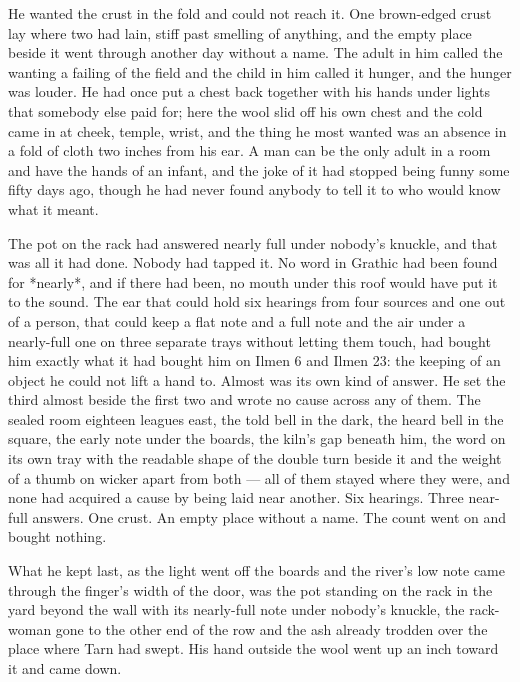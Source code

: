 He wanted the crust in the fold and could not reach it. One brown-edged crust lay where two had lain, stiff past smelling of anything, and the empty place beside it went through another day without a name. The adult in him called the wanting a failing of the field and the child in him called it hunger, and the hunger was louder. He had once put a chest back together with his hands under lights that somebody else paid for; here the wool slid off his own chest and the cold came in at cheek, temple, wrist, and the thing he most wanted was an absence in a fold of cloth two inches from his ear. A man can be the only adult in a room and have the hands of an infant, and the joke of it had stopped being funny some fifty days ago, though he had never found anybody to tell it to who would know what it meant.

The pot on the rack had answered nearly full under nobody's knuckle, and that was all it had done. Nobody had tapped it. No word in Grathic had been found for *nearly*, and if there had been, no mouth under this roof would have put it to the sound. The ear that could hold six hearings from four sources and one out of a person, that could keep a flat note and a full note and the air under a nearly-full one on three separate trays without letting them touch, had bought him exactly what it had bought him on Ilmen 6 and Ilmen 23: the keeping of an object he could not lift a hand to. Almost was its own kind of answer. He set the third almost beside the first two and wrote no cause across any of them. The sealed room eighteen leagues east, the told bell in the dark, the heard bell in the square, the early note under the boards, the kiln's gap beneath him, the word on its own tray with the readable shape of the double turn beside it and the weight of a thumb on wicker apart from both --- all of them stayed where they were, and none had acquired a cause by being laid near another. Six hearings. Three near-full answers. One crust. An empty place without a name. The count went on and bought nothing.

What he kept last, as the light went off the boards and the river's low note came through the finger's width of the door, was the pot standing on the rack in the yard beyond the wall with its nearly-full note under nobody's knuckle, the rack-woman gone to the other end of the row and the ash already trodden over the place where Tarn had swept. His hand outside the wool went up an inch toward it and came down.
